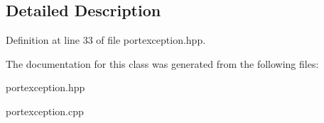 \subsection{Detailed Description}


Definition at line 33 of file portexception.\+hpp.



The documentation for this class was generated from the following files\+:\begin{DoxyCompactItemize}
\item 
portexception.\+hpp\item 
portexception.\+cpp\end{DoxyCompactItemize}
